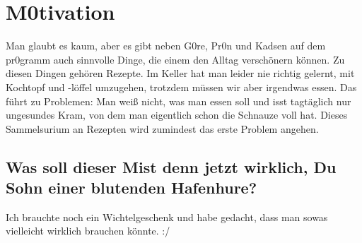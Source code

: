 \section{M0tivation}
Man glaubt es kaum, aber es gibt neben G0re, Pr0n und Kadsen auf dem pr0gramm auch sinnvolle Dinge, die einem den Alltag verschönern können. Zu diesen Dingen gehören Rezepte. Im Keller hat man leider nie richtig gelernt, mit Kochtopf und -löffel umzugehen, trotzdem müssen wir aber irgendwas essen. Das führt zu Problemen: Man weiß nicht, was man essen soll und isst tagtäglich nur ungesundes Kram, von dem man eigentlich schon die Schnauze voll hat. Dieses Sammelsurium an Rezepten wird zumindest das erste Problem angehen.

\subsection{Was soll dieser Mist denn jetzt wirklich, Du Sohn einer blutenden Hafenhure?}
Ich brauchte noch ein Wichtelgeschenk und habe gedacht, dass man sowas vielleicht wirklich brauchen könnte. :/
